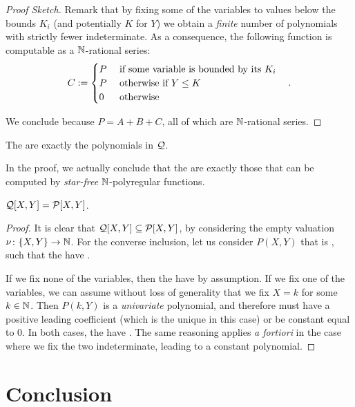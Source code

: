\documentclass[a4paper,11pt]{article}
\begin{document}
\begin{proof}[Proof Sketch]
    Remark that by fixing some of the variables
    to values 
    below the bounds $K_i$ (and potentially $K$ for $Y$)
    we obtain a \emph{finite} number of polynomials with strictly fewer
    indeterminate.
    As a consequence, the following function is computable
    as a $\mathbb{N}$-rational series:
    \begin{equation*}
        C \mathrel{:=}
        \begin{cases}
            P & \text{ if some variable is bounded by its } K_i \\
            P & \text{ otherwise if } Y \leq K \\
            0 & \text{ otherwise }
        \end{cases}
        \quad .
    \end{equation*}

    We conclude because
    $P = A + B + C$, all of which are $\mathbb{N}$-rational series.
\end{proof}

\begin{theorem}
    The  are exactly
    the polynomials in $\mathcal{Q}$.
\end{theorem}

\begin{remark}
    In the proof, we actually conclude that
    the 
    are exactly those that can be computed 
    by 
    \emph{star-free} $\mathbb{N}$-polyregular functions.
\end{remark}

\begin{lemma}
    \label{lem:correct-covered-2}
    $\mathcal{Q}[X,Y] = \mathcal{P}[X,Y]$.
\end{lemma}
\begin{proof}
    It is clear that $\mathcal{Q}[X,Y] \subseteq \mathcal{P}[X,Y]$,
    by considering the empty valuation $\nu \colon \mathopen{\{} X,Y \mathclose{\}} \to \mathbb{N}$.
    For the converse inclusion, let us consider $P(X,Y)$
    that is , such that the 
    have .
   

    If we fix none of the variables, then the 
    have  by assumption. If we fix one of the
    variables, we can assume without loss of generality that we 
    fix $X = k$ for some $k \in \mathbb{N}$.
    Then $P(k,Y)$ is a  \emph{univariate} polynomial, 
    and therefore must have a positive leading coefficient
    (which is the unique  in this case)
    or be constant equal to 0. In both cases, the 
    have .
    The same reasoning applies \emph{a fortiori} in the case where
    we fix the two indeterminate, leading to a constant polynomial.
\end{proof}

\section{Conclusion}
\label{sec:ccl}

\printbibliography

\appendix
\end{document}
